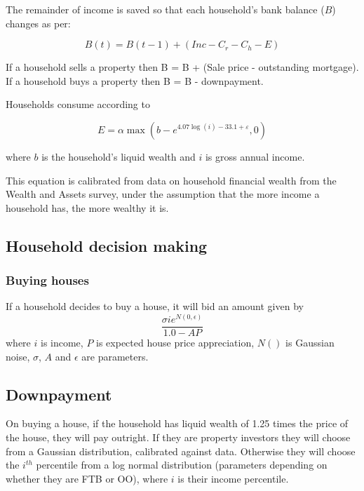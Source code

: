 \documentclass{article}
\begin{document}
The remainder of income is saved so that each household's bank balance ($B$)
changes as per:

\bigskip 
\begin{equation}
B(t)=B(t-1)+(Inc-C_{r}-C_{h}-E)
\end{equation}

\bigskip

If a household sells a property then B = B + (Sale price - outstanding
mortgage). If a household buys a property then B = B - downpayment.

Households consume according to

\begin{equation}
E=\alpha \max \left( b-e^{4.07\log (i)-33.1+\varepsilon },0\right)
\end{equation}

\bigskip

where $b$ is the household's liquid wealth and $i$ is gross annual income.

This equation is calibrated from data on household financial wealth from the
Wealth and Assets survey, under the assumption that the more income a
household has, the more wealthy it is.

\bigskip

\subsection{Household decision making}

\subsubsection{Buying houses}

If a household decides to buy a house, it will bid an amount given by
\[
 \frac{\sigma i e^{N(0,\epsilon)}}{1.0 - AP}
\]
where $i$ is income, $P$ is expected house price appreciation, $N()$ is Gaussian noise, $\sigma$, $A$ and $\epsilon$ are parameters.

\subsection{Downpayment}
On buying a house, if the household has liquid wealth of 1.25 times the price of the house, they will pay outright. If they are property investors they will choose from a Gaussian distribution, calibrated against data. Otherwise they will choose the $i^{th}$ percentile from a log normal distribution (parameters depending on whether they are FTB or OO), where $i$ is their income percentile.
\end{document}
